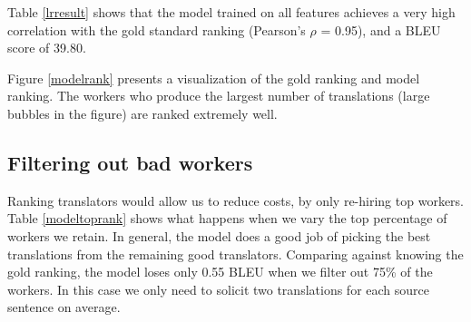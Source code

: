 \documentclass[11pt,letterpaper]{article}
\begin{document}
Table \ref{lrresult} shows that the model trained on all features achieves a very high correlation with the gold standard ranking (Pearson's $\rho$ = 0.95), and a  BLEU score of 39.80.



Figure \ref{modelrank} presents a visualization of the gold ranking and model ranking. The workers who produce the largest number of translations (large bubbles in the figure) are ranked extremely well.


\subsection{Filtering out bad workers}

Ranking translators would allow us to reduce costs, by only re-hiring top workers.
 Table \ref{modeltoprank} shows what happens when we vary the top percentage of workers we retain.  In general, the model does a good job of picking the best translations from the remaining good translators.  Comparing against knowing the gold ranking, the model loses only 0.55 BLEU when we filter out 75\% of the workers.  In this case we only need to solicit two translations for each source sentence on average.
\end{document}
